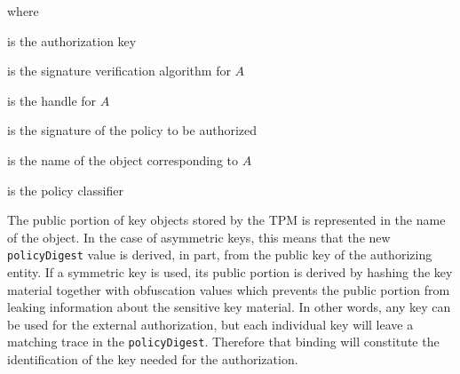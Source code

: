 \documentclass{sig-alternate-2013}
\begin{document}
\vspace{.5\baselineskip}
\noindent
{}

\vspace{.5\baselineskip}
\noindent where

\begin{description}[itemsep=.1cm]
  \small
  \item[$A$]                 \hfill is the authorization key
  \item[$\mathbf{V}()$]      \hfill is the signature verification algorithm for $A$
  \item[$keyHandle_{A}$]     \hfill is the handle for $A$
  \item[$signature$]         \hfill is the signature of the policy to be authorized
  \item[$keyName_{A}$]       \hfill is the name of the object corresponding to $A$
  \item[$policyRef$]         \hfill is the policy classifier
\end{description}


The public portion of key objects stored by the TPM is represented in the name
of the object. In the case of asymmetric keys, this means that the new
\texttt{policyDigest} value is derived, in part, from the public key of the
authorizing entity. If a symmetric key is used, its public portion is derived by
hashing the key material together with obfuscation values which prevents the
public portion from leaking information about the sensitive key material. In
other words, any key can be used for the external authorization, but each
individual key will leave a matching trace in the \texttt{policyDigest}.
Therefore that binding will constitute the identification of the key needed for
the authorization.
\end{document}
